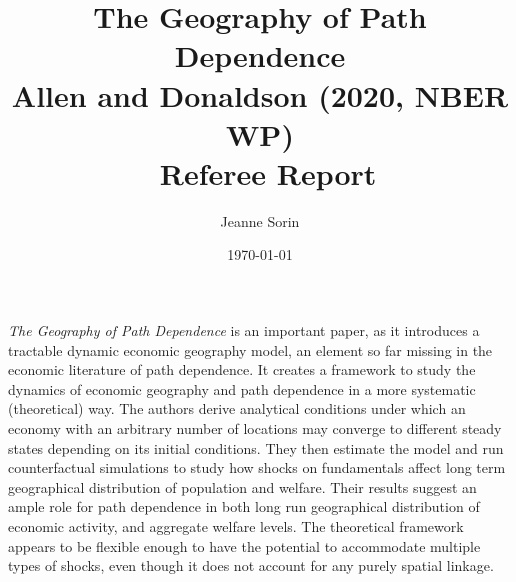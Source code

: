 \documentclass[12pt, final]{article}
\title{The Geography of Path Dependence \\Allen and Donaldson (2020, NBER WP) \\ Referee Report}
\author{Jeanne Sorin}
\date{\today}
\begin{document}
\maketitle
\newcommand{\hatxi}{\hat{\mathbf{x}}^i}
\newcommand{\tildexi}{\tilde{\mathbf{x}}^i}


\maketitle

\textit{The Geography of Path Dependence} is an important paper, as it introduces a tractable dynamic economic geography model, an element so far missing in the economic literature of path dependence. It creates a framework to study the dynamics of economic geography and path dependence in a more systematic (theoretical) way.
The authors derive analytical conditions under which an economy with an arbitrary number of locations may converge to different steady states depending on its initial conditions. They then estimate the model and run counterfactual simulations to study how shocks on fundamentals affect long term geographical distribution of population and welfare. 
Their results suggest an ample role for path dependence in both long run geographical distribution of economic activity, and aggregate welfare levels.
The theoretical framework appears to be flexible enough to have the potential to accommodate multiple types of shocks, even though it does not account for any purely spatial linkage.
\end{document}
